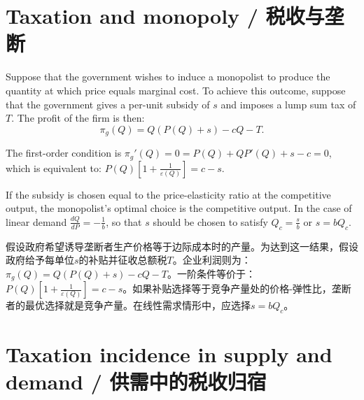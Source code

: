 \section{Taxation and monopoly / 税收与垄断}

\begin{original}
Suppose that the government wishes to induce a monopolist to produce the quantity at which price equals marginal cost. To achieve this outcome, suppose that the government gives a per-unit subsidy of $s$ and imposes a lump sum tax of $T$. The profit of the firm is then:
\[
\pi_g(Q) = Q(P(Q) + s) - cQ - T.
\]

The first-order condition is $\pi_g'(Q) = 0 = P(Q) + QP'(Q) + s - c = 0$, which is equivalent to: $P(Q)\left[1 + \frac{1}{\varepsilon(Q)}\right] = c - s$.

If the subsidy is chosen equal to the price-elasticity ratio at the competitive output, the monopolist's optimal choice is the competitive output. In the case of linear demand $\frac{dQ}{dP} = -\frac{1}{b}$, so that $s$ should be chosen to satisfy $Q_c = \frac{s}{b}$ or $s = b Q_c$.
\end{original}
\begin{translation}
假设政府希望诱导垄断者生产价格等于边际成本时的产量。为达到这一结果，假设政府给予每单位$s$的补贴并征收总额税$T$。企业利润则为：$\pi_g(Q) = Q(P(Q) + s) - cQ - T$。一阶条件等价于：$P(Q)\left[1 + \frac{1}{\varepsilon(Q)}\right] = c - s$。如果补贴选择等于竞争产量处的价格-弹性比，垄断者的最优选择就是竞争产量。在线性需求情形中，应选择$s = b Q_c$。
\end{translation}

\section{Taxation incidence in supply and demand / 供需中的税收归宿}

